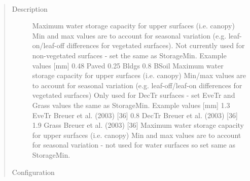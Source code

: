 \documentclass[letterpaper,10pt,english]{sphinxmanual}
\begin{document}

\begin{fulllineitems}
\label{\detokenize{input_files/SUEWS_SiteInfo/Input_Options:cmdoption-arg-storagemax}}~\begin{quote}\begin{description}
\item[{Description}] \leavevmode
Maximum water storage capacity for upper surfaces (i.e. canopy) Min and max values are to account for seasonal variation (e.g. leaf-on/leaf-off differences for vegetated surfaces). Not currently used for non-vegetated surfaces - set the same as StorageMin. Example values {[}mm{]} 0.48 Paved 0.25 Bldgs 0.8 BSoil Maximum water storage capacity for upper surfaces (i.e. canopy) Min/max values are to account for seasonal variation (e.g. leaf-off/leaf-on differences for vegetated surfaces) Only used for DecTr surfaces - set EveTr and Grass values the same as StorageMin. Example values {[}mm{]} 1.3 EveTr Breuer et al. (2003) {[}36{]}  0.8 DecTr Breuer et al. (2003) {[}36{]}  1.9 Grass Breuer et al. (2003) {[}36{]}  Maximum water storage capacity for upper surfaces (i.e. canopy) Min and max values are to account for seasonal variation - not used for water surfaces so set same as StorageMin.

\item[{Configuration}] \leavevmode


\end{description}
\end{quote}
\end{fulllineitems}
\end{document}
